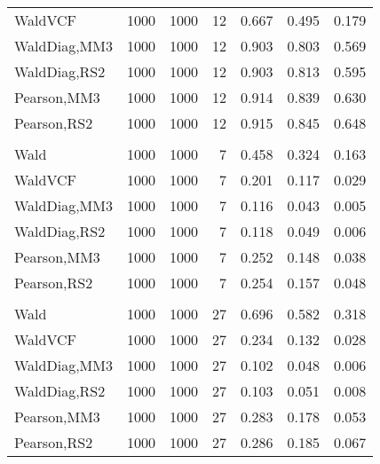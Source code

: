 \documentclass[
]{article}
\begin{document}
\begin{table}[H]
{\begin{tabular}[t]{lrrrrrr}
\hspace{1em}WaldVCF & 1000 & 1000 & 12 & 0.667 & 0.495 & 0.179\\
\hspace{1em}WaldDiag,MM3 & 1000 & 1000 & 12 & 0.903 & 0.803 & 0.569\\
\hspace{1em}WaldDiag,RS2 & 1000 & 1000 & 12 & 0.903 & 0.813 & 0.595\\
\hspace{1em}Pearson,MM3 & 1000 & 1000 & 12 & 0.914 & 0.839 & 0.630\\
\hspace{1em}Pearson,RS2 & 1000 & 1000 & 12 & 0.915 & 0.845 & 0.648\\
\addlinespace[0.3em]
\multicolumn{7}{l}{\textbf{2F 10V}}\\
\hspace{1em}Wald & 1000 & 1000 & 7 & 0.458 & 0.324 & 0.163\\
\hspace{1em}WaldVCF & 1000 & 1000 & 7 & 0.201 & 0.117 & 0.029\\
\hspace{1em}WaldDiag,MM3 & 1000 & 1000 & 7 & 0.116 & 0.043 & 0.005\\
\hspace{1em}WaldDiag,RS2 & 1000 & 1000 & 7 & 0.118 & 0.049 & 0.006\\
\hspace{1em}Pearson,MM3 & 1000 & 1000 & 7 & 0.252 & 0.148 & 0.038\\
\hspace{1em}Pearson,RS2 & 1000 & 1000 & 7 & 0.254 & 0.157 & 0.048\\
\addlinespace[0.3em]
\multicolumn{7}{l}{\textbf{3F 15V}}\\
\hspace{1em}Wald & 1000 & 1000 & 27 & 0.696 & 0.582 & 0.318\\
\hspace{1em}WaldVCF & 1000 & 1000 & 27 & 0.234 & 0.132 & 0.028\\
\hspace{1em}WaldDiag,MM3 & 1000 & 1000 & 27 & 0.102 & 0.048 & 0.006\\
\hspace{1em}WaldDiag,RS2 & 1000 & 1000 & 27 & 0.103 & 0.051 & 0.008\\
\hspace{1em}Pearson,MM3 & 1000 & 1000 & 27 & 0.283 & 0.178 & 0.053\\
\hspace{1em}Pearson,RS2 & 1000 & 1000 & 27 & 0.286 & 0.185 & 0.067\\
\bottomrule
\end{tabular}}
\endgroup{}
\end{table}
\end{document}
